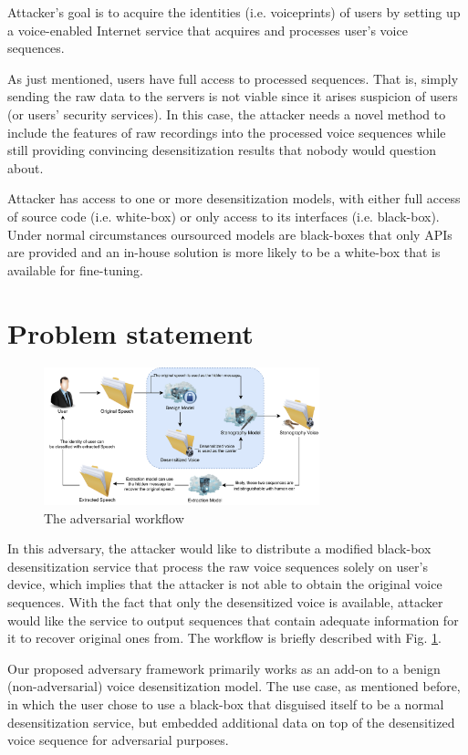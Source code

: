 \documentclass[journal]{IEEEtran} %
\begin{document}
\begin{CJK*}{UTF8}{gbsn}
Attacker's goal is to acquire the identities (i.e. voiceprints) of users by setting up a voice-enabled Internet service that acquires and processes user's voice sequences.

As just mentioned, users have full access to processed sequences. That is, simply sending the raw data to the servers is not viable since it arises suspicion of users (or users' security services). In this case, the attacker needs a novel method to include the features of raw recordings into the processed voice sequences while still providing convincing desensitization results that nobody would question about.

Attacker has access to one or more desensitization models, with either full access of source code (i.e. white-box) or only access to its interfaces (i.e. black-box). Under normal circumstances oursourced models are black-boxes that only APIs are provided and an in-house solution is more likely to be a white-box that is available for fine-tuning.

\section{Problem statement}

\begin{figure}[htbp]
    \centerline{\includegraphics[width=8cm]{methodv3.png}}
    \caption{The adversarial workflow}
    \label{wflow}
\end{figure}

In this adversary, the attacker would like to distribute a modified black-box desensitization service that process the raw voice sequences solely on user's device, which implies that the attacker is not able to obtain the original voice sequences. With the fact that only the desensitized voice is available, attacker would like the service to output sequences that contain adequate information for it to recover original ones from. The workflow is briefly described with Fig. \ref{wflow}.

Our proposed adversary framework primarily works as an add-on to a benign (non-adversarial) voice desensitization model. The use case, as mentioned before, in which the user chose to use a black-box that disguised itself to be a normal desensitization service, but embedded additional data on top of the desensitized voice sequence for adversarial purposes.


\end{CJK*}
\end{document}
